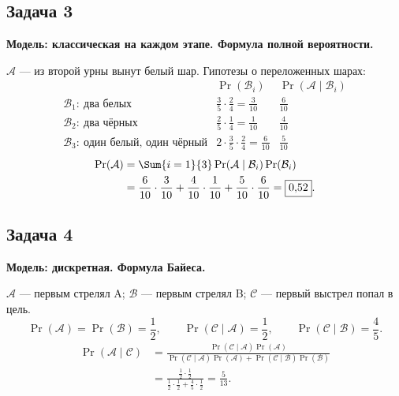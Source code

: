 \clearpage
\subsection{Задача 3}

\begin{solution}
    \textbf{Модель: классическая на каждом этапе.
    Формула полной вероятности.}

    $\mathcal{A}$ --- из второй урны вынут белый шар.
    Гипотезы о переложенных шарах:
    \[
        \begin{array}{c|c|c}
            & \Pr(\mathcal{B}_i) & \Pr(\mathcal{A}\mid\mathcal{B}_i)\\[4pt] \hline
            \mathcal{B}_1:\ \text{два белых}
                & \frac35\cdot\frac24=\frac3{10} & \frac6{10}\\[10pt]
            \mathcal{B}_2:\ \text{два чёрных}
                & \frac25\cdot\frac14=\frac1{10} & \frac4{10}\\[10pt]
            \mathcal{B}_3:\ \text{один белый, один чёрный}
                & 2\cdot\frac35\cdot\frac24=\frac6{10} & \frac5{10}
        \end{array}
    \]
    \[
        \begin{aligned}
            \Pr(\mathcal{A})
            &=\Sum{i=1}{3}
                \Pr(\mathcal{A}\mid\mathcal{B}_i)\Pr(\mathcal{B}_i)\\
            &=\frac6{10}\cdot\frac3{10}
             +\frac4{10}\cdot\frac1{10}
             +\frac5{10}\cdot\frac6{10}
             =\boxed{0{,}52}.
        \end{aligned}
    \]
\end{solution}

\subsection{Задача 4}

\begin{solution}
    \textbf{Модель: дискретная. Формула Байеса.}

    $\mathcal{A}$ --- первым стрелял A;
    $\mathcal{B}$ --- первым стрелял B;
    $\mathcal{C}$ --- первый выстрел попал в цель.
    \[
        \Pr(\mathcal{A})=\Pr(\mathcal{B})=\frac12,\qquad
        \Pr(\mathcal{C}\mid\mathcal{A})=\frac12,\qquad
        \Pr(\mathcal{C}\mid\mathcal{B})=\frac45.
    \]
    \[
        \begin{aligned}
            \Pr(\mathcal{A}\mid\mathcal{C})
            &=\frac{\Pr(\mathcal{C}\mid\mathcal{A})\Pr(\mathcal{A})}
            {\Pr(\mathcal{C}\mid\mathcal{A})\Pr(\mathcal{A})
             +\Pr(\mathcal{C}\mid\mathcal{B})\Pr(\mathcal{B})}\\
            &=\frac{\frac12\cdot\frac12}
                    {\frac12\cdot\frac12+\frac45\cdot\frac12}
              =\boxed{\frac5{13}}.
        \end{aligned}
    \]
\end{solution}

